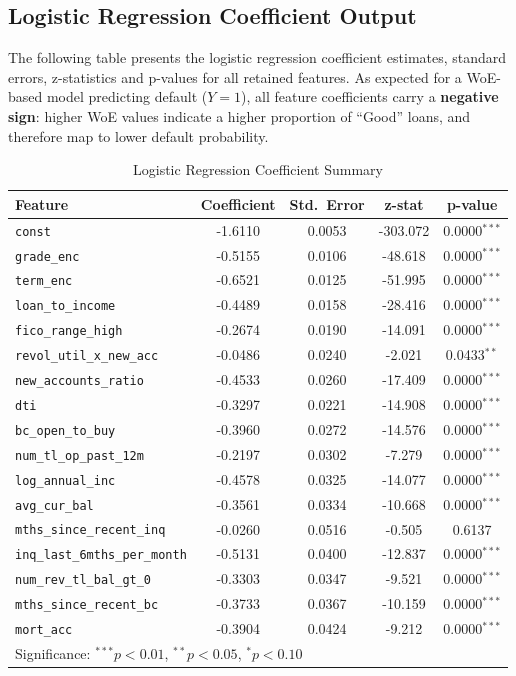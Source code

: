 \documentclass[11pt,a4paper]{article}
\begin{document}
\subsection{Logistic Regression Coefficient Output}
The following table presents the logistic regression coefficient estimates, standard errors, z-statistics and p-values for all retained features. As expected for a WoE-based model predicting default ($Y=1$), all feature coefficients carry a \textbf{negative sign}: higher WoE values indicate a higher proportion of ``Good'' loans, and therefore map to lower default probability.

\begin{table}[H]
\centering
\caption{Logistic Regression Coefficient Summary}
\label{tab:logit_coefficients}
\vspace{0.5em}
\begin{tabular}{lcccc}
\toprule
\textbf{Feature} & \textbf{Coefficient} & \textbf{Std.\ Error} & \textbf{z-stat} & \textbf{p-value} \\
\midrule
\texttt{const} & -1.6110 & 0.0053 & -303.072 & 0.0000$^{***}$ \\
\texttt{grade\_enc} & -0.5155 & 0.0106 & -48.618 & 0.0000$^{***}$ \\
\texttt{term\_enc} & -0.6521 & 0.0125 & -51.995 & 0.0000$^{***}$ \\
\texttt{loan\_to\_income} & -0.4489 & 0.0158 & -28.416 & 0.0000$^{***}$ \\
\texttt{fico\_range\_high} & -0.2674 & 0.0190 & -14.091 & 0.0000$^{***}$ \\
\texttt{revol\_util\_x\_new\_acc} & -0.0486 & 0.0240 & -2.021 & 0.0433$^{**}$ \\
\texttt{new\_accounts\_ratio} & -0.4533 & 0.0260 & -17.409 & 0.0000$^{***}$ \\
\texttt{dti} & -0.3297 & 0.0221 & -14.908 & 0.0000$^{***}$ \\
\texttt{bc\_open\_to\_buy} & -0.3960 & 0.0272 & -14.576 & 0.0000$^{***}$ \\
\texttt{num\_tl\_op\_past\_12m} & -0.2197 & 0.0302 & -7.279 & 0.0000$^{***}$ \\
\texttt{log\_annual\_inc} & -0.4578 & 0.0325 & -14.077 & 0.0000$^{***}$ \\
\texttt{avg\_cur\_bal} & -0.3561 & 0.0334 & -10.668 & 0.0000$^{***}$ \\
\texttt{mths\_since\_recent\_inq} & -0.0260 & 0.0516 & -0.505 & 0.6137 \\
\texttt{inq\_last\_6mths\_per\_month} & -0.5131 & 0.0400 & -12.837 & 0.0000$^{***}$ \\
\texttt{num\_rev\_tl\_bal\_gt\_0} & -0.3303 & 0.0347 & -9.521 & 0.0000$^{***}$ \\
\texttt{mths\_since\_recent\_bc} & -0.3733 & 0.0367 & -10.159 & 0.0000$^{***}$ \\
\texttt{mort\_acc} & -0.3904 & 0.0424 & -9.212 & 0.0000$^{***}$ \\
\midrule
\multicolumn{5}{l}{\footnotesize Significance: $^{***}p<0.01$, $^{**}p<0.05$, $^{*}p<0.10$} \\
\bottomrule
\end{tabular}
\end{table}
\end{document}
